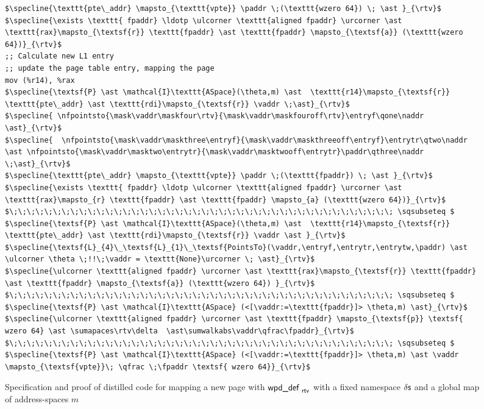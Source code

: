 \begin{figure}
\begin{lstlisting}
$\specline{\texttt{pte\_addr} \mapsto_{\texttt{vpte}} \paddr \;(\texttt{wzero 64}) \; \ast }_{\rtv}$
$\specline{\exists \texttt{ fpaddr} \ldotp \ulcorner \texttt{aligned fpaddr} \urcorner \ast \texttt{rax}\mapsto_{\textsf{r}} \texttt{fpaddr} \ast \texttt{fpaddr} \mapsto_{\textsf{a}} (\texttt{wzero 64})}_{\rtv}$
;; Calculate new L1 entry
;; update the page table entry, mapping the page
mov (%r14), %rax
$\specline{\textsf{P} \ast \mathcal{I}\texttt{ASpace}(\theta,m) \ast  \texttt{r14}\mapsto_{\textsf{r}} \texttt{pte\_addr} \ast \texttt{rdi}\mapsto_{\textsf{r}} \vaddr \;\ast}_{\rtv}$
$\specline{ \nfpointsto{\mask\vaddr\maskfour\rtv}{\mask\vaddr\maskfouroff\rtv}\entryf\qone\naddr \ast}_{\rtv}$ 
$\specline{  \nfpointsto{\mask\vaddr\maskthree\entryf}{\mask\vaddr\maskthreeoff\entryf}\entrytr\qtwo\naddr \ast \nfpointsto{\mask\vaddr\masktwo\entrytr}{\mask\vaddr\masktwooff\entrytr}\paddr\qthree\naddr \;\ast}_{\rtv}$
$\specline{\texttt{pte\_addr} \mapsto_{\texttt{vpte}} \paddr \;(\texttt{fpaddr}) \; \ast }_{\rtv}$
$\specline{\exists \texttt{ fpaddr} \ldotp \ulcorner \texttt{aligned fpaddr} \urcorner \ast \texttt{rax}\mapsto_{r} \texttt{fpaddr} \ast \texttt{fpaddr} \mapsto_{a} (\texttt{wzero 64})}_{\rtv}$
$\;\;\;\;\;\;\;\;\;\;\;\;\;\;\;\;\;\;\;\;\;\;\;\;\;\;\;\;\;\;\;\;\;\;\;\;\;\;\;\;\;\;\;\; \sqsubseteq $
$\specline{\textsf{P} \ast \mathcal{I}\texttt{ASpace}(\theta,m) \ast  \texttt{r14}\mapsto_{\textsf{r}} \texttt{pte\_addr} \ast \texttt{rdi}\mapsto_{\textsf{r}} \vaddr \ast }_{\rtv}$
$\specline{\textsf{L}_{4}\_\textsf{L}_{1}\_\textsf{PointsTo}(\vaddr,\entryf,\entrytr,\entrytw,\paddr) \ast \ulcorner \theta \;!!\;\vaddr = \texttt{None}\urcorner \; \ast}_{\rtv}$
$\specline{\ulcorner \texttt{aligned fpaddr} \urcorner \ast \texttt{rax}\mapsto_{\textsf{r}} \texttt{fpaddr} \ast \texttt{fpaddr} \mapsto_{\textsf{a}} (\texttt{wzero 64}) }_{\rtv}$
$\;\;\;\;\;\;\;\;\;\;\;\;\;\;\;\;\;\;\;\;\;\;\;\;\;\;\;\;\;\;\;\;\;\;\;\;\;\;\;\;\;\;\;\; \sqsubseteq $
$\specline{\textsf{P} \ast \mathcal{I}\texttt{ASpace} (<[\vaddr:=\texttt{fpaddr}]> \theta,m) \ast}_{\rtv}$
$\specline{\ulcorner \texttt{aligned fpaddr} \urcorner \ast \texttt{fpaddr} \mapsto_{\textsf{p}} \textsf{ wzero 64} \ast \sumapaces\rtv\delta  \ast\sumwalkabs\vaddr\qfrac\fpaddr}_{\rtv}$
$\;\;\;\;\;\;\;\;\;\;\;\;\;\;\;\;\;\;\;\;\;\;\;\;\;\;\;\;\;\;\;\;\;\;\;\;\;\;\;\;\;\;\;\; \sqsubseteq $
$\specline{\textsf{P} \ast \mathcal{I}\texttt{ASpace} (<[\vaddr:=\texttt{fpaddr}]> \theta,m) \ast \vaddr \mapsto_{\textsf{vpte}}\; \qfrac \;\fpaddr \textsf{ wzero 64}}_{\rtv}$
\end{lstlisting}
  \caption{Specification and proof of distilled code for mapping a new page with $\textsf{wpd\_def }_{\textsf{rtv}}$ with a fixed namespace $\delta\textsf{s}$ and a global map of address-spaces $m$  }
\label{fig:mapping_code}
\end{figure}
